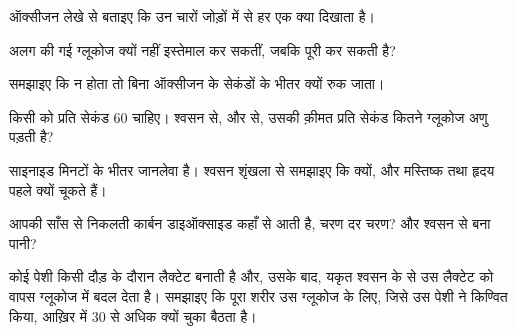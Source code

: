 \begin{exercise}[$\star\star$]\label{exo:g12:respiration-fermentation:6}
ऑक्सीजन लेखे से बताइए कि उन चारों जोड़ों में से हर एक क्या दिखाता है।
\end{exercise}

\begin{exercise}[$\star\star$]\label{exo:g12:respiration-fermentation:7}
अलग की गई  ग्लूकोज क्यों नहीं इस्तेमाल कर सकतीं, जबकि पूरी
 कर सकती है?
\end{exercise}

\begin{exercise}[$\star\star$]\label{exo:g12:respiration-fermentation:8}
समझाइए कि  न होता तो बिना ऑक्सीजन के  सेकंडों के भीतर
क्यों रुक जाता।
\end{exercise}

\begin{exercise}[$\star\star$]\label{exo:g12:respiration-fermentation:9}
किसी  को प्रति सेकंड 60  चाहिए। श्वसन से, और  से, उसकी
क़ीमत प्रति सेकंड कितने ग्लूकोज अणु पड़ती है?
\end{exercise}

\begin{exercise}[$\star\star$]\label{exo:g12:respiration-fermentation:10}
साइनाइड मिनटों के भीतर जानलेवा है। श्वसन शृंखला से समझाइए कि क्यों, और
मस्तिष्क तथा हृदय पहले क्यों चूकते हैं।
\end{exercise}

\begin{exercise}[$\star\star$]\label{exo:g12:respiration-fermentation:11}
आपकी साँस से निकलती कार्बन डाइऑक्साइड कहाँ से आती है, चरण दर चरण? और श्वसन
से बना पानी?
\end{exercise}

\begin{exercise}[$\star\star\star$]\label{exo:g12:respiration-fermentation:12}
कोई पेशी किसी दौड़ के दौरान लैक्टेट बनाती है और, उसके बाद, यकृत श्वसन के 
से उस लैक्टेट को वापस ग्लूकोज में बदल देता है। समझाइए कि पूरा शरीर उस
ग्लूकोज के लिए, जिसे उस पेशी ने किण्वित किया, आख़िर में 30  से अधिक क्यों
चुका बैठता है।
\end{exercise}


